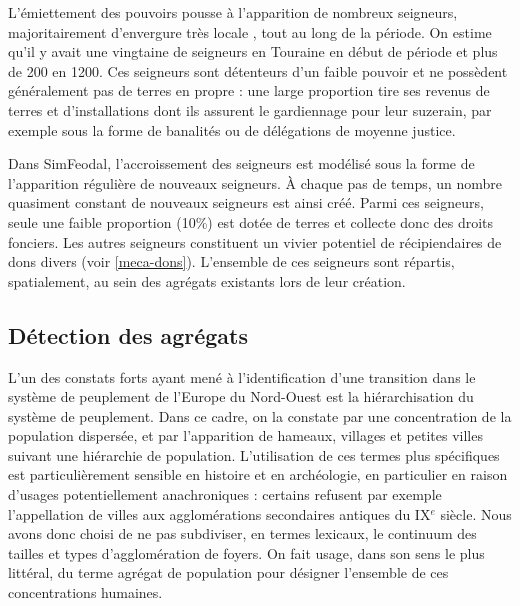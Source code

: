 L'émiettement des pouvoirs pousse à l'apparition de nombreux seigneurs, majoritairement d'envergure très locale , tout au long de la période.
On estime qu'il y avait une vingtaine de seigneurs en Touraine en début de période et plus de 200 en 1200.
Ces seigneurs sont détenteurs d'un faible pouvoir et ne possèdent généralement pas de terres \og en propre\fg{} : une large proportion tire ses revenus de terres et d'installations dont ils assurent le gardiennage pour leur suzerain, par exemple sous la forme de banalités ou de délégations de moyenne justice.

\begin{tcolorbox}[breakable,left=0pt,right=0pt,top=0pt,bottom=0pt,
	colback=gray!15,colframe=gray!15,width=\dimexpr\textwidth\relax, 
	enlarge left by=0mm, boxsep=5pt,arc=0pt,outer arc=0pt]
Dans SimFeodal, l'accroissement des seigneurs est modélisé sous la forme de l'apparition régulière de nouveaux seigneurs.
À chaque pas de temps, un nombre quasiment constant\footnotemark{} de nouveaux seigneurs est ainsi créé.
Parmi ces seigneurs, seule une faible proportion (10\%) est dotée de terres et collecte donc des droits fonciers.
Les autres seigneurs constituent un vivier potentiel de récipiendaires de dons divers (voir \cref{meca-dons}).
L'ensemble de ces seigneurs sont répartis, spatialement, au sein des agrégats existants lors de leur création.
\end{tcolorbox}

\subsection{Détection des agrégats \label{meca-agregats}}

L'un des constats forts ayant mené à l'identification d'une \og transition\fg{} \autocite{pumain_convergences_2017, nuninger_cadre_2017} dans le système de peuplement de l'Europe du Nord-Ouest est la hiérarchisation du système de peuplement.
Dans ce cadre, on la constate par une concentration de la population dispersée, et par l'apparition de hameaux, villages et petites villes suivant une hiérarchie de population.
L'utilisation de ces termes plus spécifiques est particulièrement sensible en histoire et en archéologie, en particulier en raison d'usages potentiellement anachroniques : certains refusent par exemple l'appellation de villes aux agglomérations secondaires antiques du IX$^e$ siècle.
Nous avons donc choisi de ne pas subdiviser, en termes lexicaux, le continuum des tailles et types d'agglomération de foyers.
On fait usage, dans son sens le plus littéral, du terme \og agrégat\fg{} de population pour désigner l'ensemble de ces concentrations humaines.

